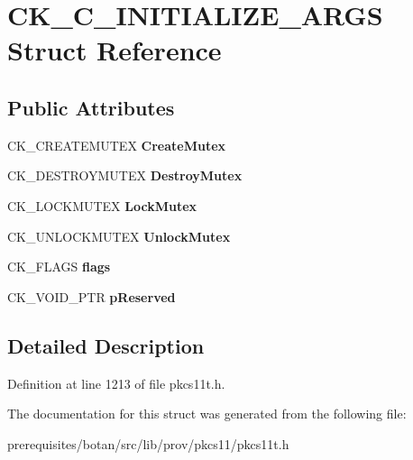 \hypertarget{struct_c_k___c___i_n_i_t_i_a_l_i_z_e___a_r_g_s}{}\section{C\+K\+\_\+\+C\+\_\+\+I\+N\+I\+T\+I\+A\+L\+I\+Z\+E\+\_\+\+A\+R\+GS Struct Reference}
\label{struct_c_k___c___i_n_i_t_i_a_l_i_z_e___a_r_g_s}
\subsection*{Public Attributes}
\begin{DoxyCompactItemize}
\item 
\mbox{\label{struct_c_k___c___i_n_i_t_i_a_l_i_z_e___a_r_g_s_ae4a461121c37163cb153f17f1b4598de}} 
C\+K\+\_\+\+C\+R\+E\+A\+T\+E\+M\+U\+T\+EX {\bfseries Create\+Mutex}
\item 
\mbox{\label{struct_c_k___c___i_n_i_t_i_a_l_i_z_e___a_r_g_s_a9b5ebf676f4a6c9306b68567f89a4efd}} 
C\+K\+\_\+\+D\+E\+S\+T\+R\+O\+Y\+M\+U\+T\+EX {\bfseries Destroy\+Mutex}
\item 
\mbox{\label{struct_c_k___c___i_n_i_t_i_a_l_i_z_e___a_r_g_s_acb3c3965f4190053337b9195e88f0d0c}} 
C\+K\+\_\+\+L\+O\+C\+K\+M\+U\+T\+EX {\bfseries Lock\+Mutex}
\item 
\mbox{\label{struct_c_k___c___i_n_i_t_i_a_l_i_z_e___a_r_g_s_a39405e53ae004b728c1f17d462c1bea5}} 
C\+K\+\_\+\+U\+N\+L\+O\+C\+K\+M\+U\+T\+EX {\bfseries Unlock\+Mutex}
\item 
\mbox{\label{struct_c_k___c___i_n_i_t_i_a_l_i_z_e___a_r_g_s_a8fd53ac76a9bc361f4fb2127b74cfc16}} 
C\+K\+\_\+\+F\+L\+A\+GS {\bfseries flags}
\item 
\mbox{\label{struct_c_k___c___i_n_i_t_i_a_l_i_z_e___a_r_g_s_a7c88d9ed84cd898ea906f20d096689a8}} 
C\+K\+\_\+\+V\+O\+I\+D\+\_\+\+P\+TR {\bfseries p\+Reserved}
\end{DoxyCompactItemize}


\subsection{Detailed Description}


Definition at line 1213 of file pkcs11t.\+h.



The documentation for this struct was generated from the following file\+:\begin{DoxyCompactItemize}
\item 
prerequisites/botan/src/lib/prov/pkcs11/pkcs11t.\+h\end{DoxyCompactItemize}
